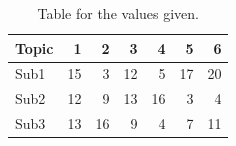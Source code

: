 \begin{table}[h!]
    \centering
    \begin{tabular}{|l|r|r|r|r|r|r|}
        \hline
        Topic &  1 &  2 &  3 &  4 &  5 &  6  \\ \hline \hline
        Sub1  & 15 &  3 & 12 &  5 & 17 & 20   \\ \hline
        Sub2  & 12 &  9 & 13 & 16 &  3 &  4   \\ \hline
        Sub3  & 13 & 16 &  9 &  4 &  7 & 11   \\ \hline
    \end{tabular}
    \caption{Table for the values given.}
    \label{tab:}
\end{table}

